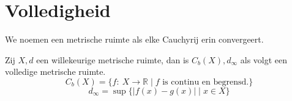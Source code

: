 \documentclass[main.tex]{subfiles}
\begin{document}
\section{Volledigheid}
\label{sec:volledigheid}

\begin{de}
  \label{de:volledige-metrische-ruimte}
  We noemen een metrische ruimte  als elke Cauchyrij erin convergeert.
\end{de}

\begin{bpr}
  \label{pr:begrensde-functies-van-metrische-ruimte-naar-r-volledig}
  Zij $X,d$ een willekeurige metrische ruimte, dan is $C_{b}(X),d_{\infty}$ als volgt een volledige metrische ruimte.
  \[ C_{b}(X) = \{ f:\ X \rightarrow \mathbb{R} \mid f \text{ is continu en begrensd.} \} \]
  \[ d_{\infty} = \sup\{ |f(x)-g(x)| \mid x \in X \} \]


\end{bpr}
\end{document}
